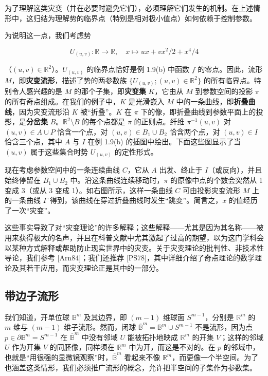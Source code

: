 \begin{remark}
为了理解这类灾变（并在必要时避免它们），必须理解它们发生的机制。在上述情形中，这归结为理解势的临界点（特别是相对极小值点）如何依赖于控制参数。

为说明这一点，我们考虑势

\[
U_{(u, v)}: \mathbb{R} \to \mathbb{R}, \quad x \mapsto ux + vx^2/2 + x^4/4
\]

（$ (u, v) \in \mathbb{R}^2 $）。$ U_{(u, v)} $ 的临界点恰好是例 1.9(b) 中函数 $ f $ 的零点。因此，流形 $ M $，即\textbf{灾变流形}，描述了势的两参数族 $ \{U_{(u, v)} ; (u, v) \in \mathbb{R}^2\} $ 的所有临界点。特别令人感兴趣的是 $ M $ 的那个子集，即\textbf{灾变集} $ K $，它由从 $ M $ 到参数空间的投影 $ \pi $ 的所有奇点组成。在我们的例子中，$ K $ 是光滑嵌入 $ M $ 中的一条曲线，即\textbf{折叠曲线}，因为灾变流形沿 $ K $ 被“折叠”。$ K $ 在 $ \pi $ 下的像，即折叠曲线到参数平面上的投影，是\textbf{分岔集} $ B $。$ \mathbb{R}^2 \setminus B $ 的每个点都是 $ \pi $ 的正则点。纤维 $ \pi^{-1}(u, v) $ 对 $ (u, v) \in A \cup P $ 恰含一个点，对 $ (u, v) \in B_1 \cup B_2 $ 恰含两个点，对 $ (u, v) \in I $ 恰含三个点，其中 $ A $ 与 $ I $ 在例 1.9(b) 的插图中绘出。下面这些图显示了当 $ (u, v) $ 属于这些集合时势 $ U_{(u, v)} $ 的定性形式。


现在考虑参数空间中的一条连续曲线 $ C $，它从 $ A $ 出发、终止于 $ I $（或反向），并且始终停留在 $ B_1\cup B_2 $ 中。沿这条曲线连续移动时，$ \pi $ 的原像中点的个数会突然从 1 变成 3（或从 3 变成 1）。如右图所示，这样一条曲线 $ C $ 可由投影灾变流形 $ M $ 上的一条曲线 $ \Gamma $ 得到，该曲线在穿过折叠曲线时发生“跳变”。简言之，$ x $ 的值经历了一次“灾变”。

这些事实导致了对“灾变理论”的许多解释；这些解释——尤其是因为其名称——被用来获得极大的名声，并且在科普文献中尤其激起了过高的期望，以为这门学科会以某种方式解释或帮助防止现实世界中的灾变。关于灾变理论的批判性、非技术性导论，我们参考 [Arn84]；我们还推荐 [PS78]，其中详细介绍了奇点理论的数学理论及其若干应用，而灾变理论正是其中的一部分。

\end{remark}

\subsection*{带边子流形}

我们知道，开单位球 $ \mathbb{B}^m $ 及其边界，即 $ (m-1) $ 维球面 $ S^{m-1} $，分别是 $ \mathbb{R}^m $ 的 $ m $ 维与 $ (m-1) $ 维子流形。然而，闭球 $ \overline{\mathbb{B}}^m = \mathbb{B}^m\cup S^{m-1} $ 不是流形，因为点 $ p \in \partial\mathbb{B}^m = S^{m-1} $ 在 $ \overline{\mathbb{B}}^m $ 中没有邻域 $ U $ 能被拓扑地映成 $ \mathbb{R}^m $ 的开集 $ V $；这样的邻域 $ U $ 作为开集 $ V $ 的同胚像，同样须在 $ \mathbb{R}^m $ 中为开，而这是不对的。在 $ p $ 的邻域中，也就是“用很强的显微镜观察”时，$ \overline{\mathbb{B}}^m $ 看起来不像 $ \mathbb{R}^m $，而更像一个半空间。为了也涵盖这类情形，我们必须推广流形的概念，允许把半空间的子集作为参数集。

